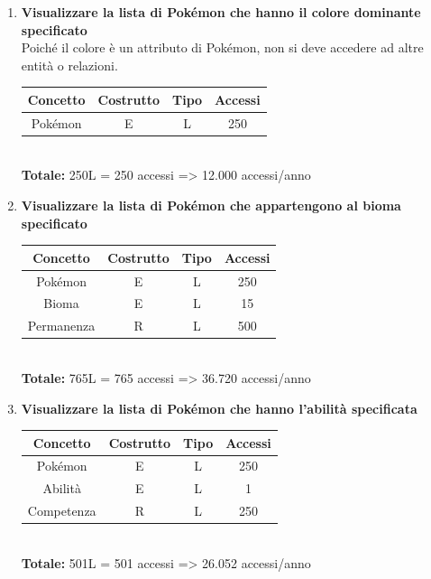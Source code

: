 \documentclass[a4paper,12pt]{report}
\begin{document}
\begin{enumerate}
  \textbf{Totale:} 816L = 816 accessi => 587.520 accessi/anno
  
  \item \textbf{Visualizzare la lista di Pokémon che hanno il colore dominante specificato} \\
  Poiché il colore è un attributo di Pokémon, non si deve accedere ad altre entità o relazioni.
  
  \begin{tabular}{|c|c|c|c|}
  	\hline
  	\rowcolor{gray!30}Concetto & Costrutto & Tipo & Accessi \\
    \hline
    Pokémon & E & L & 250 \\
    \hline
  \end{tabular} \\
  
  \textbf{Totale:} 250L = 250 accessi => 12.000 accessi/anno
  
  \item \textbf{Visualizzare la lista di Pokémon che appartengono al bioma specificato}
  
  \begin{tabular}{|c|c|c|c|}
  	\hline
  	\rowcolor{gray!30}Concetto & Costrutto & Tipo & Accessi \\
    \hline
    Pokémon & E & L & 250 \\
  	\hline
    Bioma & E & L & 15 \\
    \hline
    Permanenza & R & L & 500 \\
    \hline
  \end{tabular} \\
  
  \textbf{Totale:} 765L = 765 accessi => 36.720 accessi/anno
  
  \item \textbf{Visualizzare la lista di Pokémon che hanno l'abilità specificata}
  
  \begin{tabular}{|c|c|c|c|}
  	\hline
  	\rowcolor{gray!30}Concetto & Costrutto & Tipo & Accessi \\
    \hline
    Pokémon & E & L & 250 \\
  	\hline
    Abilità & E & L & 1 \\
    \hline
    Competenza & R & L & 250 \\
    \hline
  \end{tabular} \\
  
  \textbf{Totale:} 501L = 501 accessi => 26.052 accessi/anno
  

\end{enumerate}
\end{document}
